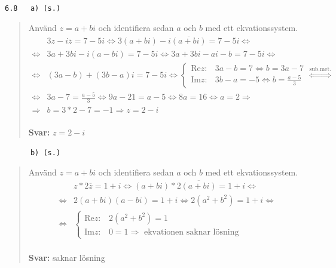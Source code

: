 \documentclass[a4paper]{article}
\newcommand{\tskcol}[1]{\textcolor{tskcol}{#1}}
\begin{document}
	\texttt{\tskcol{6.8~~~a) (s.)}}
	\begin{quotation}
		\noindent
		Använd $z=a+bi$ och identifiera sedan $a$ och $b$ med ett ekvationssystem.
		\begin{align*}
		&3z-i\overline{z}=7-5i \Leftrightarrow
		3(a+bi)-i\overline{(a+bi)}=7-5i \Leftrightarrow \\ \Leftrightarrow
		&3a+3bi-i(a-bi)=7-5i \Leftrightarrow
		3a+3bi-ai-b=7-5i \Leftrightarrow \\ \Leftrightarrow
		&(3a-b)+(3b-a)i=7-5i \Leftrightarrow
		\begin{cases}
		\text{Re}z: &3a-b=7 \Leftrightarrow b = 3a-7\\
		\text{Im}z: &3b-a=-5 \Leftrightarrow b = \frac{a-5}{3}
		\end{cases} \overset{\text{sub.met.}}{\Leftrightarrow} \\ \Leftrightarrow
		&3a-7=\frac{a-5}{3} \Leftrightarrow
		9a-21=a-5 \Leftrightarrow
		8a=16 \Leftrightarrow
		a=2 \Rightarrow \\ \Rightarrow
		&b=3*2-7=-1 \Rightarrow
		z=2-i
		\end{align*}
		\\
		\textbf{Svar:} $z=2-i$
	\end{quotation}
	
	\pagebreak
	\texttt{\tskcol{~~~~~~b) (s.)}}
	\begin{quotation}
		\noindent
		Använd $z=a+bi$ och identifiera sedan $a$ och $b$ med ett ekvationssystem.
		\begin{align*}
		&z*2\overline{z}=1+i \Leftrightarrow
		(a+bi)*2\overline{(a+bi)}=1+i \Leftrightarrow \\ \Leftrightarrow
		&2(a+bi)(a-bi)=1+i \Leftrightarrow
		2(a^2+b^2)=1+i \Leftrightarrow \\ \Leftrightarrow
		&\begin{cases}
		\text{Re}z: &2(a^2+b^2)=1 \\
		\text{Im}z: &0=1 \Rightarrow \text{ ekvationen saknar lösning}
		\end{cases}
		\end{align*}
		\\
		\textbf{Svar:} saknar lösning
	\end{quotation}
	
\end{document}

